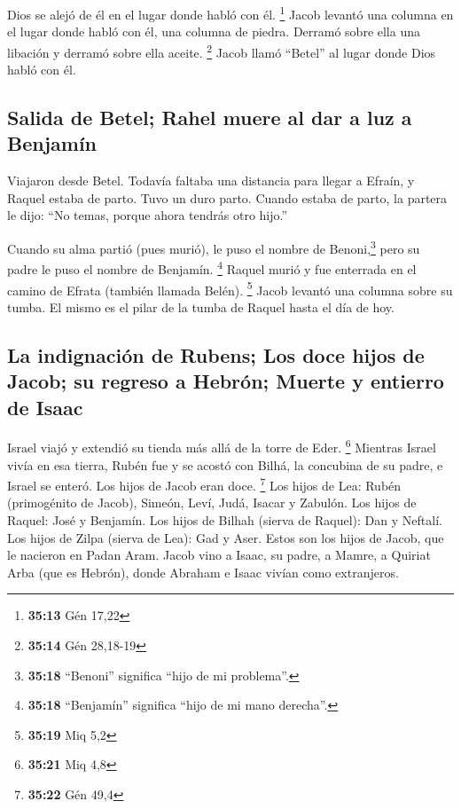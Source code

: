 \begin{paracol}{2}
 Dios se alejó de él en el lugar donde habló con él.
\footnote{\textbf{35:13} Gén 17,22}  Jacob levantó una
columna en el lugar donde habló con él, una columna de piedra. Derramó
sobre ella una libación y derramó sobre ella aceite. \footnote{\textbf{35:14}
  Gén 28,18-19}  Jacob llamó ``Betel'' al lugar donde
Dios habló con él.

\hypertarget{salida-de-betel-rahel-muere-al-dar-a-luz-a-benjamuxedn}{%
\subsection{Salida de Betel; Rahel muere al dar a luz a
Benjamín}\label{salida-de-betel-rahel-muere-al-dar-a-luz-a-benjamuxedn}}

 Viajaron desde Betel. Todavía faltaba una distancia para
llegar a Efraín, y Raquel estaba de parto. Tuvo un duro parto.
 Cuando estaba de parto, la partera le dijo: ``No temas,
porque ahora tendrás otro hijo.''

 Cuando su alma partió (pues murió), le puso el nombre de
Benoni,\footnote{\textbf{35:18} ``Benoni'' significa ``hijo de mi
  problema''.} pero su padre le puso el nombre de Benjamín. \footnote{\textbf{35:18}
  ``Benjamín'' significa ``hijo de mi mano derecha''.} 
Raquel murió y fue enterrada en el camino de Efrata (también llamada
Belén). \footnote{\textbf{35:19} Miq 5,2}  Jacob levantó
una columna sobre su tumba. El mismo es el pilar de la tumba de Raquel
hasta el día de hoy.

\hypertarget{la-indignaciuxf3n-de-rubens-los-doce-hijos-de-jacob-su-regreso-a-hebruxf3n-muerte-y-entierro-de-isaac}{%
\subsection{La indignación de Rubens; Los doce hijos de Jacob; su
regreso a Hebrón; Muerte y entierro de
Isaac}\label{la-indignaciuxf3n-de-rubens-los-doce-hijos-de-jacob-su-regreso-a-hebruxf3n-muerte-y-entierro-de-isaac}}

 Israel viajó y extendió su tienda más allá de la torre
de Eder. \footnote{\textbf{35:21} Miq 4,8}  Mientras
Israel vivía en esa tierra, Rubén fue y se acostó con Bilhá, la
concubina de su padre, e Israel se enteró. Los hijos de Jacob eran doce.
\footnote{\textbf{35:22} Gén 49,4}  Los hijos de Lea:
Rubén (primogénito de Jacob), Simeón, Leví, Judá, Isacar y Zabulón.
 Los hijos de Raquel: José y Benjamín. 
Los hijos de Bilhah (sierva de Raquel): Dan y Neftalí. 
Los hijos de Zilpa (sierva de Lea): Gad y Aser. Estos son los hijos de
Jacob, que le nacieron en Padan Aram.  Jacob vino a
Isaac, su padre, a Mamre, a Quiriat Arba (que es Hebrón), donde Abraham
e Isaac vivían como extranjeros.


\end{paracol}
